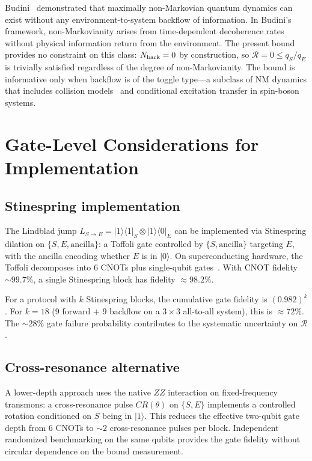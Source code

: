 \documentclass[aps,pra,onecolumn]{revtex4-2}
\begin{document}
Budini~\cite{Budini:2018} demonstrated that maximally non-Markovian quantum dynamics can exist without any environment-to-system backflow of information. In Budini's framework, non-Markovianity arises from time-dependent decoherence rates without physical information return from the environment. The present bound provides no constraint on this class: $N_{\rm back} = 0$ by construction, so $\mathcal{R} = 0 \leq q_S/q_E$ is trivially satisfied regardless of the degree of non-Markovianity. The bound is informative only when backflow is of the toggle type---a subclass of NM dynamics that includes collision models~\cite{Breuer:2016} and conditional excitation transfer in spin-boson systems.

\section{Gate-Level Considerations for Implementation}

\subsection{Stinespring implementation}

The Lindblad jump $L_{S\to E} = |1\rangle\langle 1|_S \otimes |1\rangle\langle 0|_E$ can be implemented via Stinespring dilation on $\{S, E, \text{ancilla}\}$: a Toffoli gate controlled by $\{S, \text{ancilla}\}$ targeting $E$, with the ancilla encoding whether $E$ is in $|0\rangle$. On superconducting hardware, the Toffoli decomposes into 6 CNOTs plus single-qubit gates~\cite{Shende:2009}. With CNOT fidelity $\sim 99.7\%$, a single Stinespring block has fidelity $\approx 98.2\%$.

For a protocol with $k$ Stinespring blocks, the cumulative gate fidelity is $(0.982)^k$. For $k=18$ (9 forward + 9 backflow on a $3 \times 3$ all-to-all system), this is $\approx 72\%$. The $\sim 28\%$ gate failure probability contributes to the systematic uncertainty on $\mathcal{R}$.

\subsection{Cross-resonance alternative}

A lower-depth approach uses the native $ZZ$ interaction on fixed-frequency transmons: a cross-resonance pulse $CR(\theta)$ on $\{S, E\}$ implements a controlled rotation conditioned on $S$ being in $|1\rangle$. This reduces the effective two-qubit gate depth from 6 CNOTs to $\sim 2$ cross-resonance pulses per block. Independent randomized benchmarking on the same qubits provides the gate fidelity without circular dependence on the bound measurement.
\end{document}
